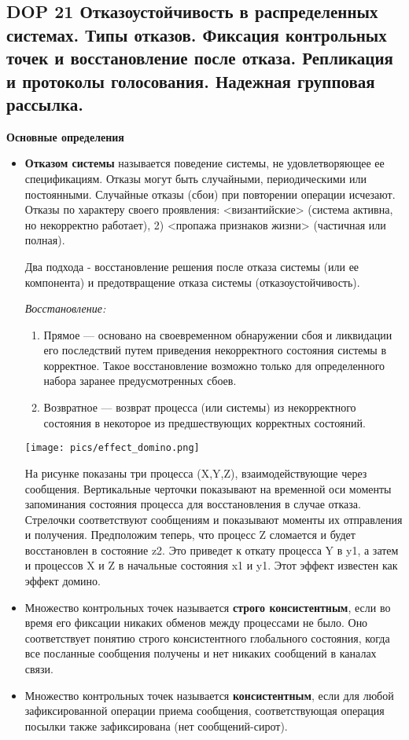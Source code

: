 \subsection{DOP 21 Отказоустойчивость  в  распределенных  системах.  Типы  отказов.  Фиксация  контрольных  точек  и восстановление после отказа. Репликация и протоколы голосования. Надежная групповая рассылка.}

\textbf{Основные определения}

\begin{itemize}
    \item \textbf{Отказом системы} называется поведение системы, не удовлетворяющее ее спецификациям.
    Отказы могут быть случайными, периодическими или постоянными. 
    Случайные отказы (сбои) при повторении операции исчезают. 
    Отказы по характеру своего проявления: <византийские> (система активна, но некорректно работает), 2) <пропажа признаков жизни> (частичная или полная). 
    
    Два подхода - восстановление решения после отказа системы (или ее компонента) и предотвращение отказа системы (отказоустойчивость).
    
    \textit{Восстановление:}
    \begin{enumerate}
        \item Прямое --- основано на своевременном обнаружении сбоя и ликвидации его последствий путем приведения некорректного состояния системы в корректное. 
        Такое восстановление возможно только для определенного набора заранее предусмотренных сбоев.
        \item Возвратное --- возврат процесса (или системы) из некорректного состояния в некоторое из предшествующих корректных состояний.
    \end{enumerate}
    
    \texttt{[image: pics/effect\_domino.png]}
    
    На рисунке показаны три процесса (X,Y,Z), взаимодействующие через сообщения. Вертикальные черточки показывают на временной оси моменты запоминания состояния процесса для восстановления в случае отказа. Стрелочки соответствуют сообщениям и показывают моменты их отправления и получения. Предположим теперь, что процесс Z сломается и будет восстановлен в состояние z2. Это приведет к откату процесса Y в y1, а затем и процессов X и Z в начальные состояния x1 и y1. Этот эффект известен как эффект домино.
    
    \item Множество контрольных точек называется \textbf{строго консистентным}, если во время его фиксации никаких обменов между процессами не было. 
    Оно соответствует понятию строго консистентного глобального состояния, когда все посланные сообщения получены и нет никаких сообщений в каналах связи.
    \item Множество контрольных точек называется \textbf{консистентным}, если для любой зафиксированной операции приема сообщения, соответствующая операция посылки также зафиксирована (нет сообщений-сирот).
\end{itemize}

